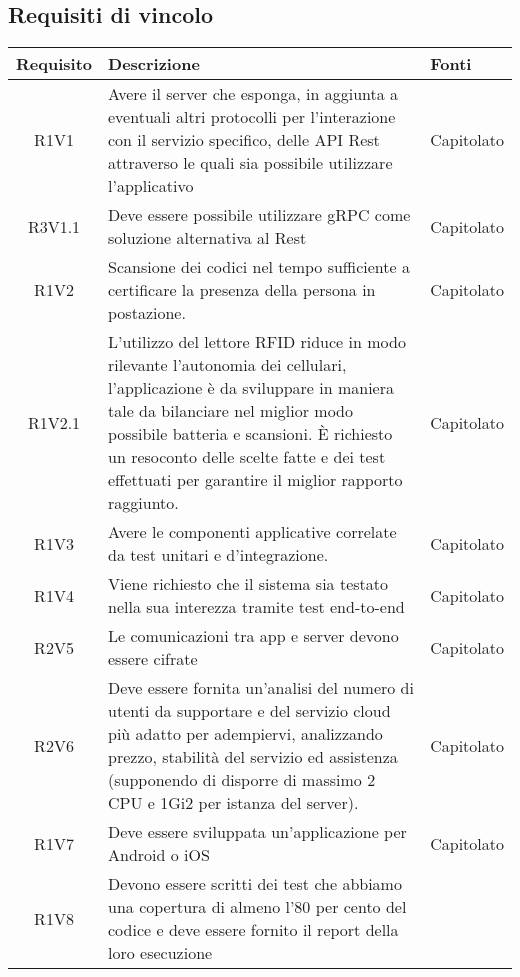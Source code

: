 \subsection{Requisiti di vincolo}
\begin{center}
	\begin{longtable}{|c|p{10cm}|p{4cm}|}
		\hline
		\rowcolor{lighter-grayer}
		\textbf{Requisito} & \textbf{Descrizione} & \textbf{Fonti}  \\
		\hline
		\endfirsthead
		
		 R1V1 &Avere il server che esponga, in aggiunta a eventuali altri protocolli per l’interazione con il servizio specifico, delle API Rest attraverso le quali sia possibile utilizzare l'applicativo &Capitolato \\
		\hline
		R3V1.1&Deve essere possibile utilizzare gRPC come soluzione alternativa al Rest	& Capitolato	\\
		\hline
R1V2&Scansione dei codici nel tempo sufficiente a certificare la presenza  della persona in postazione.	& Capitolato	\\
		\hline
R1V2.1&L’utilizzo del lettore RFID riduce in modo rilevante l’autonomia dei cellulari, l’applicazione è da sviluppare in maniera tale da bilanciare nel miglior modo possibile batteria e scansioni. È richiesto un resoconto delle scelte fatte e dei test effettuati per garantire il miglior rapporto raggiunto.	& Capitolato	\\
		\hline
		R1V3&Avere le componenti applicative correlate da test unitari e d’integrazione.	& Capitolato	\\
		\hline
R1V4&Viene richiesto che il sistema sia testato nella sua interezza tramite test end-to-end	& Capitolato	\\
		\hline
R2V5&Le comunicazioni tra app e server devono essere cifrate	& Capitolato	\\
		\hline
		R2V6&	Deve essere fornita un'analisi del numero di utenti da supportare e del servizio cloud più adatto per adempiervi, analizzando prezzo, stabilità del servizio ed assistenza (supponendo di disporre di massimo 2 CPU e 1Gi2 per istanza del server).& Capitolato	\\
		\hline
R1V7&Deve essere sviluppata un'applicazione per Android o iOS	& Capitolato	\\
		\hline
R1V8&Devono essere scritti dei test che abbiamo una copertura di almeno l'80 per cento del codice e deve essere fornito il report della loro esecuzione	& 	\\
		\hline


\end{longtable}
\end{center}
